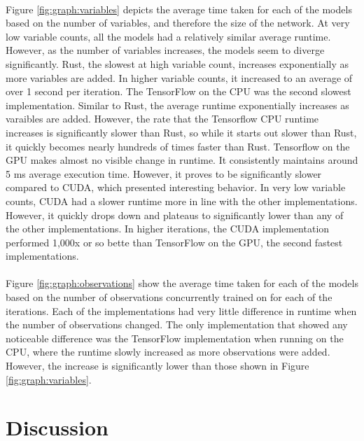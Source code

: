 \documentclass[12pt]{article}
\begin{document}
\paragraph{}
Figure \ref{fig:graph:variables} depicts the average time taken for each of the models based on the number of variables, and therefore the size of the network.
At very low variable counts, all the models had a relatively similar average runtime.
However, as the number of variables increases, the models seem to diverge significantly.
Rust, the slowest at high variable count, increases exponentially as more variables are added.
In higher variable counts, it increased to an average of over 1 second per iteration.
The TensorFlow on the CPU was the second slowest implementation.
Similar to Rust, the average runtime exponentially increases as varaibles are added.
However, the rate that the Tensorflow CPU runtime increases is significantly slower than Rust, so while it starts out slower than Rust, it quickly becomes nearly hundreds of times faster than Rust.
Tensorflow on the GPU makes almost no visible change in runtime.
It consistently maintains around 5 ms average execution time.
However, it proves to be significantly slower compared to CUDA, which presented interesting behavior.
In very low variable counts, CUDA had a slower runtime more in line with the other implementations.
However, it quickly drops down and plateaus to significantly lower than any of the other implementations.
In higher iterations, the CUDA implementation performed 1,000x or so bette than TensorFlow on the GPU, the second fastest implementations.

\paragraph{}
Figure \ref{fig:graph:observations} show the average time taken for each of the models based on the number of observations concurrently trained on for each of the iterations.
Each of the implementations had very little difference in runtime when the number of observations changed.
The only implementation that showed any noticeable difference was the TensorFlow implementation when running on the CPU, where the runtime slowly increased as more observations were added.
However, the increase is significantly lower than those shown in Figure \ref{fig:graph:variables}.

\section{Discussion}
\end{document}
